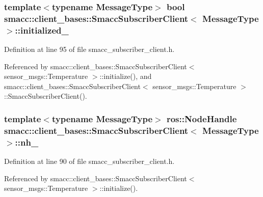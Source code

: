 \subsubsection[{\texorpdfstring{initialized\+\_\+}{initialized_}}]{\setlength{\rightskip}{0pt plus 5cm}template$<$typename Message\+Type$>$ {\bf bool} {\bf smacc\+::client\+\_\+bases\+::\+Smacc\+Subscriber\+Client}$<$ Message\+Type $>$\+::initialized\+\_\+\hspace{0.3cm}{\ttfamily [private]}}\hypertarget{classsmacc_1_1client__bases_1_1SmaccSubscriberClient_a2096c76f6464d0a513625cc53dba51ed}{}\label{classsmacc_1_1client__bases_1_1SmaccSubscriberClient_a2096c76f6464d0a513625cc53dba51ed}


Definition at line 95 of file smacc\+\_\+subscriber\+\_\+client.\+h.



Referenced by smacc\+::client\+\_\+bases\+::\+Smacc\+Subscriber\+Client$<$ sensor\+\_\+msgs\+::\+Temperature $>$\+::initialize(), and smacc\+::client\+\_\+bases\+::\+Smacc\+Subscriber\+Client$<$ sensor\+\_\+msgs\+::\+Temperature $>$\+::\+Smacc\+Subscriber\+Client().

\subsubsection[{\texorpdfstring{nh\+\_\+}{nh_}}]{\setlength{\rightskip}{0pt plus 5cm}template$<$typename Message\+Type$>$ ros\+::\+Node\+Handle {\bf smacc\+::client\+\_\+bases\+::\+Smacc\+Subscriber\+Client}$<$ Message\+Type $>$\+::nh\+\_\+\hspace{0.3cm}{\ttfamily [protected]}}\hypertarget{classsmacc_1_1client__bases_1_1SmaccSubscriberClient_a401d2476e89e27acc2e905acd701f053}{}\label{classsmacc_1_1client__bases_1_1SmaccSubscriberClient_a401d2476e89e27acc2e905acd701f053}


Definition at line 90 of file smacc\+\_\+subscriber\+\_\+client.\+h.



Referenced by smacc\+::client\+\_\+bases\+::\+Smacc\+Subscriber\+Client$<$ sensor\+\_\+msgs\+::\+Temperature $>$\+::initialize().

